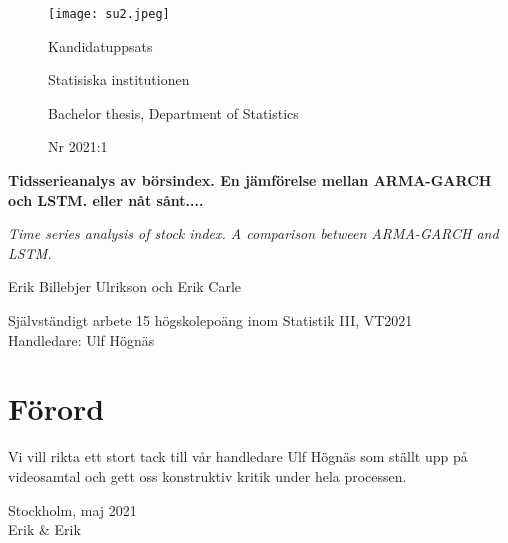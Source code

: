 \documentclass[11pt]{article}
\numberwithin{equation}{section}
\numberwithin{table}{section}
\numberwithin{figure}{section}
\begin{document}
\begin{titlepage}
\thispagestyle{empty}
	\begin{figure}[ht]
			\texttt{[image: su2.jpeg]}
			
	   \endminipage
		 \Large Kandidatuppsats \par
		 \large Statisiska institutionen \par
		  \small Bachelor thesis, Department of   Statistics \par
		   \large Nr 2021:1 \par
			
\endminipage
\end{figure}
	
	
\centering
\vspace{5cm}

{\large\bfseries Tidsserieanalys av börsindex. En jämförelse mellan ARMA-GARCH och LSTM. eller nåt sånt....\par}
	\vspace{0.5cm}
	
{\large\itshape Time series analysis of stock index. A comparison between ARMA-GARCH and LSTM. \par}
	\vfill
	
	

{\Large Erik Billebjer Ulrikson och Erik Carle\par}
	\vspace{0.5cm}
	
\begin{flushleft}
Självständigt arbete 15 högskolepoäng inom Statistik III, VT2021 \\
Handledare: Ulf Högnäs\\

\end{flushleft}
\end{titlepage}

\newpage
\section*{Förord}
Vi vill rikta ett stort tack till vår handledare Ulf Högnäs som ställt upp på
videosamtal och gett oss konstruktiv kritik under hela processen. \bigbreak

Stockholm, maj 2021 \\
Erik \& Erik
\null
\newpage

\newpage
\thispagestyle{empty}
\end{document}
